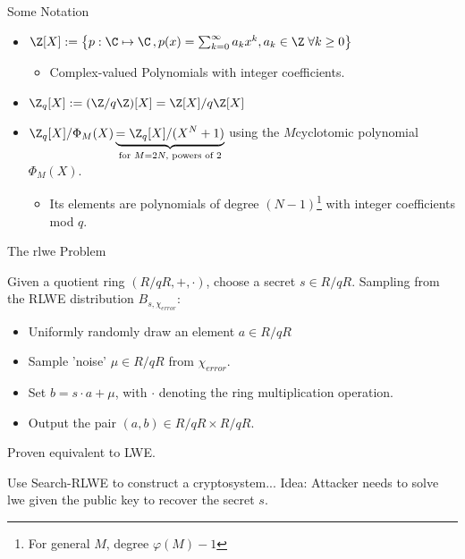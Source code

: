 \begin{frame}{Some Notation}
  \begin{itemize}
    \item $\Z[X] := \big\{p: \C \mapsto \C \,, p(x) = \sum_{k=0}^\infty a_k x^k, a_k \in \Z \;\forall k \geq 0\big\}$
          \begin{itemize}
            \item Complex-valued Polynomials with integer coefficients.
          \end{itemize}
    \item $\Z_q[X] := (\Z/q\Z)[X] = \Z[X] / q\Z[X]$
    \item $\Z_q[X] / \Phi_M(X) \underbrace{ = \Z_q[X]/(X^N+1)}_{\text{for } M=2N, \text{ powers of 2}}$ using the $M$\th cyclotomic polynomial $\Phi_M(X)$.
          \begin{itemize}
            \item Its elements are polynomials of degree $(N-1)$\footnote{For general $M$, degree $\varphi(M) - 1$} with integer coefficients mod $q$.
          \end{itemize}
  \end{itemize}
\end{frame}

\begin{frame}{The \gls{rlwe} Problem}
  \begin{corollary}
    Given a quotient ring $(R/qR, +, \cdot)$, choose a secret $s \in R/qR$.
    Sampling from the RLWE distribution $B_{s, \chi_{error}}$:
    \begin{itemize}
      \item Uniformly randomly draw an element $a \in R/qR$
      \item Sample 'noise' $\mu \in R/qR$ from $\chi_{error}$.
      \item Set $b = s \cdot a + \mu$, with $\cdot$ denoting the ring multiplication operation.
      \item Output the pair $(a, b) \in R/qR \times R/qR$.
    \end{itemize}
  \end{corollary}

  Proven equivalent to LWE.

  Use Search-RLWE to construct a cryptosystem...
  Idea: Attacker needs to solve \gls{lwe} given the public key to recover the secret $s$.
\end{frame}
